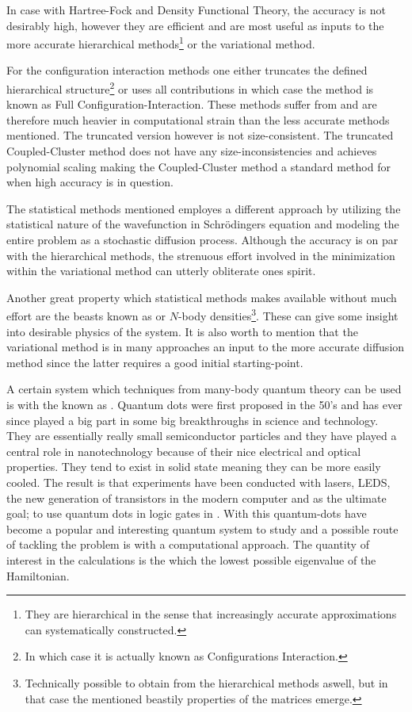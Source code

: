     In case with Hartree-Fock and Density Functional Theory, the accuracy is
    not desirably high, however they are efficient and are most useful as
    inputs to the more accurate hierarchical methods\footnote{They are
    hierarchical in the sense that increasingly accurate approximations can
    systematically constructed.} or the variational method.

    For the configuration interaction methods one either truncates the defined
    hierarchical structure\footnote{In which case it is actually known as
    Configurations Interaction.} or uses all contributions in which case the
    method is known as Full Configuration-Interaction. These methods suffer
    from  and are therefore much heavier in
    computational strain than the less accurate methods mentioned. The
    truncated version however is not size-consistent.  The truncated
    Coupled-Cluster method does not have any size-inconsistencies and achieves
    polynomial scaling making the Coupled-Cluster method a standard method for
    when high accuracy is in question. 

    The statistical methods mentioned employes a different approach by
    utilizing the statistical nature of the wavefunction in Schrödingers
    equation and modeling the entire problem as a stochastic diffusion process.
    Although the accuracy is on par with the hierarchical methods, the
    strenuous effort involved in the minimization within the variational method
    can utterly obliterate ones spirit.

    Another great property which statistical methods makes available without
    much effort are the beasts known as  or $N$-body
    densities\footnote{Technically possible to obtain from the hierarchical
    methods aswell, but in that case the mentioned beastily properties of the
    matrices emerge.}. These can give some insight into desirable physics of
    the system. It is also worth to mention that the variational method is in
    many approaches an input to the more accurate diffusion method since the
    latter requires a good initial starting-point.

    A certain system which techniques from many-body quantum theory can be used
    is with the  known as .
    Quantum dots were first proposed in the 50's and has ever since played a
    big part in some big breakthroughs in science and technology. They are
    essentially really small semiconductor particles and they have played a
    central role in nanotechnology because of their nice electrical and optical
    properties. They tend to exist in solid state meaning they can be more
    easily cooled. The result is that experiments have been conducted with
    lasers, LEDS, the new generation of transistors in the modern computer and
    as the ultimate goal; to use quantum dots in logic gates in . With this quantum-dots have become a popular and interesting
    quantum system to study and a possible route of tackling the problem is
    with a computational approach. The quantity of interest in the calculations
    is the  which the lowest possible eigenvalue of
    the Hamiltonian.

